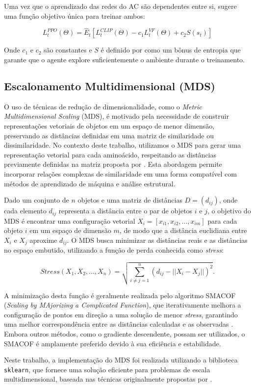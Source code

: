Uma vez que o aprendizado das redes do AC são dependentes entre si, \cite{PPO} sugere uma função objetivo única para treinar ambos:

\begin{equation}
   L_t ^{PPO} (\Theta) = \hat{E}_t[L_t ^{CLIP} (\Theta) - c_1 L_t ^{VF} (\Theta) + c_2 S(s_t)]
\end{equation}

Onde $c_1$ e $c_2$ são constantes e $S$ é definido por \cite{PPO} como um bônus de entropia que garante que o agente explore suficientemente o ambiente durante o treinamento.


\subsection{Escalonamento Multidimensional (MDS)}  
\label{subsection:MDS}  

O uso de técnicas de redução de dimensionalidade, como o \textit{Metric Multidimensional Scaling} (MDS),
é motivado pela necessidade de construir representações vetoriais de objetos em um espaço de menor dimensão,
preservando as distâncias definidas em uma matriz de similaridade ou dissimilaridade.
No contexto deste trabalho, utilizamos o MDS para gerar uma representação vetorial para cada aminoácido,
respeitando as distâncias previamente definidas na matriz proposta por \cite{aminodist}. 
Esta abordagem permite incorporar relações complexas de similaridade em uma forma compatível com métodos de aprendizado de máquina e
análise estrutural.  

Dado um conjunto de $n$ objetos e uma matriz de distâncias $D = (d_{ij})$,
onde cada elemento $d_{ij}$ representa a distância entre o par de objetos $i$ e $j$,
o objetivo do MDS é encontrar uma configuração vetorial $X_i = [x_{i1}, x_{i2}, ..., x_{im}]$ 
para cada objeto $i$ em um espaço de dimensão $m$,
de modo que a distância euclidiana entre $X_i$ e $X_j$ aproxime $d_{ij}$. 
O MDS busca minimizar as distâncias reais e as distâncias no espaço embutido, 
utilizando a função de perda conhecida como \textit{stress}:

\begin{equation}
    Stress(X_1, X_2, ..., X_n) = \sqrt{\sum_{i \neq j = 1}^{n} (d_{ij} - ||X_i - X_j||)^2}.
\end{equation}

A minimização desta função é geralmente realizada pelo algoritmo 
SMACOF (\textit{Scaling by MAjorizing a Complicated Function}),
que iterativamente melhora a configuração de pontos em direção a uma solução de menor \textit{stress},
garantindo uma melhor correspondência entre as distâncias calculadas e as observadas \cite{mds}.
Embora outros métodos, como o gradiente descendente, possam ser utilizados, 
o SMACOF é amplamente preferido devido à sua eficiência e estabilidade.

Neste trabalho, 
a implementação do MDS foi realizada utilizando a biblioteca \texttt{sklearn}, 
que fornece uma solução eficiente para problemas de escala multidimensional, 
baseada nas técnicas originalmente propostas por \cite{mds}.












